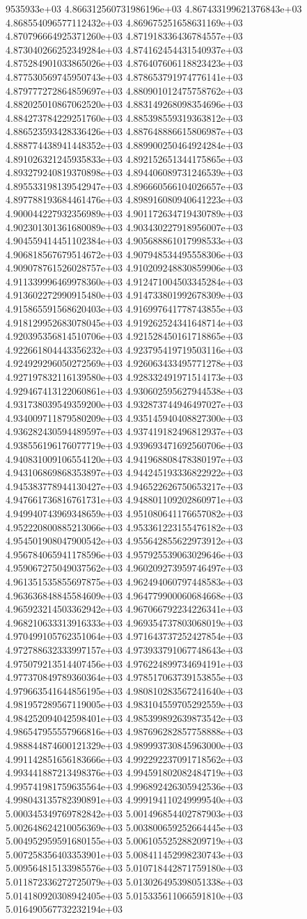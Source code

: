 9535933e+03	4.866312560731986196e+03	4.867433199621376843e+03	4.868554096577112432e+03	4.869675251658631169e+03	4.870796664925371260e+03	4.871918336436784557e+03	4.873040266252349284e+03	4.874162454431540937e+03	4.875284901033865026e+03	4.876407606118823423e+03	4.877530569745950743e+03	4.878653791974776141e+03	4.879777272864859697e+03	4.880901012475758762e+03	4.882025010867062520e+03	4.883149268098354696e+03	4.884273784229251760e+03	4.885398559319363812e+03	4.886523593428336426e+03	4.887648886615806987e+03	4.888774438941448352e+03	4.889900250464924284e+03	4.891026321245935833e+03	4.892152651344175865e+03	4.893279240819370898e+03	4.894406089731246539e+03	4.895533198139542947e+03	4.896660566104026657e+03	4.897788193684461476e+03	4.898916080940641223e+03	4.900044227932356989e+03	4.901172634719430789e+03	4.902301301361680089e+03	4.903430227918956007e+03	4.904559414451102384e+03	4.905688861017998533e+03	4.906818567679514672e+03	4.907948534495558306e+03	4.909078761526028757e+03	4.910209248830859906e+03	4.911339996469978360e+03	4.912471004503345284e+03	4.913602272990915480e+03	4.914733801992678309e+03	4.915865591568620403e+03	4.916997641778743855e+03	4.918129952683078045e+03	4.919262524341648714e+03	4.920395356814510706e+03	4.921528450161718865e+03	4.922661804443356232e+03	4.923795419719503116e+03	4.924929296050272569e+03	4.926063433495771278e+03	4.927197832116139580e+03	4.928332491971514173e+03	4.929467413122060861e+03	4.930602595627944538e+03	4.931738039549359200e+03	4.932873744946497027e+03	4.934009711879580209e+03	4.935145940408827300e+03	4.936282430594489597e+03	4.937419182496812937e+03	4.938556196176077719e+03	4.939693471692560706e+03	4.940831009106554120e+03	4.941968808478380197e+03	4.943106869868353897e+03	4.944245193336822922e+03	4.945383778944130427e+03	4.946522626750653217e+03	4.947661736816761731e+03	4.948801109202860971e+03	4.949940743969348659e+03	4.951080641176657082e+03	4.952220800885213066e+03	4.953361223155476182e+03	4.954501908047900542e+03	4.955642855622973912e+03	4.956784065941178596e+03	4.957925539063029646e+03	4.959067275049037562e+03	4.960209273959746497e+03	4.961351535855697875e+03	4.962494060797448583e+03	4.963636848845584609e+03	4.964779900060684668e+03	4.965923214503362942e+03	4.967066792234226341e+03	4.968210633313916333e+03	4.969354737803068019e+03	4.970499105762351064e+03	4.971643737252427854e+03	4.972788632333997157e+03	4.973933791067748643e+03	4.975079213514407456e+03	4.976224899734694191e+03	4.977370849789360364e+03	4.978517063739153855e+03	4.979663541644856195e+03	4.980810283567241640e+03	4.981957289567119005e+03	4.983104559705292559e+03	4.984252094042598401e+03	4.985399892639873542e+03	4.986547955557966816e+03	4.987696282857758888e+03	4.988844874600121329e+03	4.989993730845963000e+03	4.991142851656183666e+03	4.992292237091718562e+03	4.993441887213498376e+03	4.994591802082484719e+03	4.995741981759635564e+03	4.996892426305942536e+03	4.998043135782390891e+03	4.999194110249999540e+03	5.000345349769782842e+03	5.001496854402787903e+03	5.002648624210056369e+03	5.003800659252664445e+03	5.004952959591680155e+03	5.006105525288209719e+03	5.007258356403353901e+03	5.008411452998230743e+03	5.009564815133985576e+03	5.010718442871759180e+03	5.011872336272725079e+03	5.013026495398051338e+03	5.014180920308942405e+03	5.015335611066591810e+03	5.016490567732232194e+03
